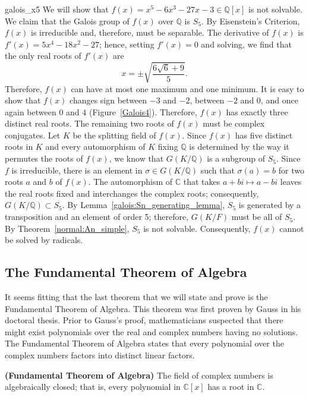 

\begin{example}{galois_x5}
We will show that $f(x) = x^5 - 6 x^3 - 27 x - 3 \in {\mathbb Q}[x]$ is
not solvable. We claim that the Galois group of $f(x)$ over ${\mathbb Q}$
is $S_5$. By Eisenstein's Criterion, $f(x)$ is irreducible and,
therefore, must be separable. The derivative of $f(x)$ is $f'(x) = 5
x^4 - 18 x^2 - 27$; hence, setting $f'(x) = 0$ and solving, we find
that the only real roots of $f'(x)$ are
\[
x = \pm \sqrt{ \frac{6 \sqrt{6} + 9 }{5} }.
\]
Therefore, $f(x)$ can have at most one maximum and one minimum.  It is
easy to show that $f(x)$ changes sign between $-3$ and $-2$, between
$-2$ and $0$, and once again between $0$ and $4$
(Figure~\ref{Galois4}). Therefore, $f(x)$ has exactly three distinct
real roots. The remaining two roots of $f(x)$ must be complex
conjugates. Let $K$ be the splitting field of $f(x)$. Since $f(x)$ has
five distinct roots in $K$ and every automorphism of $K$ fixing ${\mathbb
Q}$ is determined by the way it permutes the roots of $f(x)$, we know
that $G(K/{\mathbb Q})$ is a subgroup of $S_5$. Since $f$ is irreducible,
there is an element in $\sigma \in G(K/{\mathbb Q})$ such that $\sigma(a)
= b$ for two roots $a$ and $b$ of $f(x)$. The automorphism of ${\mathbb
C}$ that takes $a+bi \mapsto a-bi$ leaves the real roots fixed and
interchanges the complex roots; consequently, $G(K/{\mathbb Q} ) \subset
S_5$. By Lemma~\ref{galois:Sn_generating_lemma}, $S_5$ is generated by a transposition and an
element of order 5; therefore, $G(K/F)$ must be all of $S_5$. By
Theorem~\ref{normal:An_simple}, $S_5$ is not solvable. Consequently, $f(x)$ cannot be
solved by radicals.  
\end{example}
 
 
 
\subsection*{The Fundamental Theorem of Algebra}
 
 
It seems fitting that the last theorem that we will state and prove
is the Fundamental Theorem of Algebra. This theorem was first proven
by Gauss in his doctoral thesis.  Prior to Gauss's proof, mathematicians 
suspected that there might exist polynomials over the real and complex 
numbers having no solutions. The Fundamental Theorem of Algebra states
that every polynomial over the complex numbers factors into distinct
linear factors. 
 
 
\begin{theorem} {\bf (Fundamental Theorem of Algebra)}
The field of complex numbers is algebraically closed; that is, every
polynomial in ${\mathbb C}[x]$ has a root in ${\mathbb C}$. 
\end{theorem}
 
